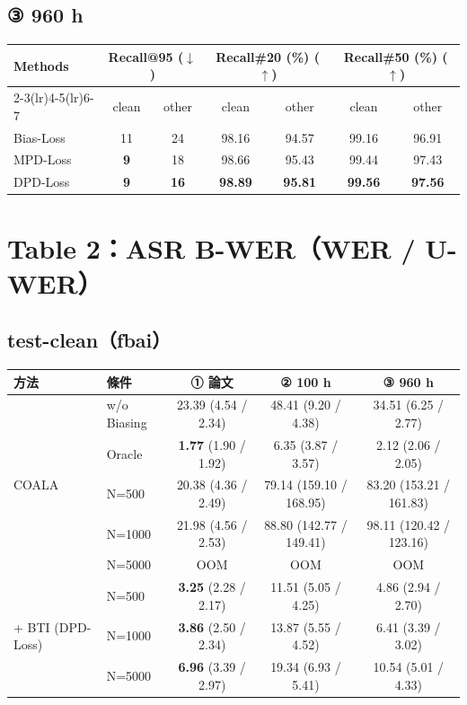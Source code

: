 \documentclass[11pt,a4paper]{article}
\begin{document}
\subsection*{③ 960 h}

\begin{center}
\begin{tabular}{lcccccc}
\toprule
\multirow{2}{*}{\textbf{Methods}} & \multicolumn{2}{c}{\textbf{Recall@95} ($\downarrow$)} & \multicolumn{2}{c}{\textbf{Recall\#20} (\%) ($\uparrow$)} & \multicolumn{2}{c}{\textbf{Recall\#50} (\%) ($\uparrow$)} \\
\cmidrule(lr){2-3}\cmidrule(lr){4-5}\cmidrule(lr){6-7}
 & clean & other & clean & other & clean & other \\
\midrule
Bias-Loss & 11 & 24 & 98.16 & 94.57 & 99.16 & 96.91 \\
MPD-Loss  & \textbf{9} & 18 & 98.66 & 95.43 & 99.44 & 97.43 \\
DPD-Loss  & \textbf{9} & \textbf{16} & \textbf{98.89} & \textbf{95.81} & \textbf{99.56} & \textbf{97.56} \\
\bottomrule
\end{tabular}
\end{center}

\section*{Table 2：ASR B-WER（WER / U-WER）}

\subsection*{test-clean（fbai）}

\begin{center}
{\small
\begin{tabular}{llccc}
\toprule
\textbf{方法} & \textbf{條件} & \textbf{① 論文} & \textbf{② 100 h} & \textbf{③ 960 h} \\
\midrule
\multirow{5}{*}{COALA}
 & w/o Biasing & 23.39 (4.54 / 2.34) & 48.41 (9.20 / 4.38) & 34.51 (6.25 / 2.77) \\
 & Oracle      & \textbf{1.77} (1.90 / 1.92) & 6.35 (3.87 / 3.57) & 2.12 (2.06 / 2.05) \\
 & N=500       & 20.38 (4.36 / 2.49) & 79.14 (159.10 / 168.95) & 83.20 (153.21 / 161.83) \\
 & N=1000      & 21.98 (4.56 / 2.53) & 88.80 (142.77 / 149.41) & 98.11 (120.42 / 123.16) \\
 & N=5000      & OOM & OOM & OOM \\
\midrule
\multirow{3}{*}{+ BTI (DPD-Loss)}
 & N=500       & \textbf{3.25} (2.28 / 2.17) & 11.51 (5.05 / 4.25) & 4.86 (2.94 / 2.70) \\
 & N=1000      & \textbf{3.86} (2.50 / 2.34) & 13.87 (5.55 / 4.52) & 6.41 (3.39 / 3.02) \\
 & N=5000      & \textbf{6.96} (3.39 / 2.97) & 19.34 (6.93 / 5.41) & 10.54 (5.01 / 4.33) \\
\bottomrule
\end{tabular}
}
\end{center}
\end{document}
